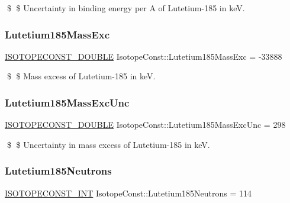\$ \$ Uncertainty in binding energy per A of Lutetium-\/185 in keV. \mbox{\label{group___isotope_const-_lutetium-_lu185_ga1207e0758cbf0ed316cbe5d50d2d703c}} 
\subsubsection{\texorpdfstring{Lutetium185\+Mass\+Exc}{Lutetium185MassExc}}
{\footnotesize\ttfamily \mbox{\hyperlink{group___isotope_const-_macros_ga8f45a7272ce02c0b4c65c44636ed719a}{I\+S\+O\+T\+O\+P\+E\+C\+O\+N\+S\+T\+\_\+\+D\+O\+U\+B\+LE}} Isotope\+Const\+::\+Lutetium185\+Mass\+Exc = -\/33888}

\$ \$ Mass excess of Lutetium-\/185 in keV. \mbox{\label{group___isotope_const-_lutetium-_lu185_ga9e9fe8df6a41448ca3312d549c36c3cc}} 
\subsubsection{\texorpdfstring{Lutetium185\+Mass\+Exc\+Unc}{Lutetium185MassExcUnc}}
{\footnotesize\ttfamily \mbox{\hyperlink{group___isotope_const-_macros_ga8f45a7272ce02c0b4c65c44636ed719a}{I\+S\+O\+T\+O\+P\+E\+C\+O\+N\+S\+T\+\_\+\+D\+O\+U\+B\+LE}} Isotope\+Const\+::\+Lutetium185\+Mass\+Exc\+Unc = 298}

\$ \$ Uncertainty in mass excess of Lutetium-\/185 in keV. \mbox{\label{group___isotope_const-_lutetium-_lu185_ga43e4aa642bc30e7f8c6ad6841fe12e22}} 
\subsubsection{\texorpdfstring{Lutetium185\+Neutrons}{Lutetium185Neutrons}}
{\footnotesize\ttfamily \mbox{\hyperlink{group___isotope_const-_macros_ga5f18360b3e99483a35c32d789e62621c}{I\+S\+O\+T\+O\+P\+E\+C\+O\+N\+S\+T\+\_\+\+I\+NT}} Isotope\+Const\+::\+Lutetium185\+Neutrons = 114}

